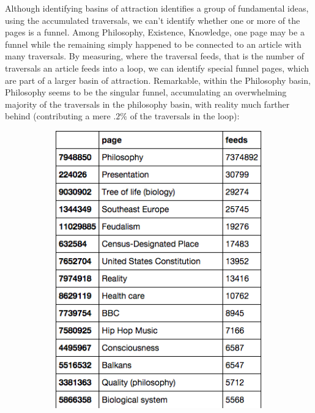 \documentclass[twoside]{article}
\begin{document}
Although identifying basins of attraction identifies a group of fundamental ideas, 
using the accumulated traversals, we can't identify whether one or more of the pages is a funnel. 
Among Philosophy, Existence, Knowledge, one page may be a funnel while the remaining simply happened to be connected to an article with many traversals. By measuring, where the traversal feeds, that is the number of traversals an article feeds into a loop, we can identify special funnel pages, 
which are part of a larger basin of attraction. Remarkable, within the Philosophy basin, 
Philosophy seems to be the singular funnel, accumulating an overwhelming majority of the traversals in the philosophy basin, with reality much farther behind (contributing a mere $.2\%$ of the 
traversals in the loop): 

\begin{figure}[H]
\centering
    \caption{Top Funnels}
    \begin{subfigure}[b]{0.5\textwidth}
        \includegraphics[width=\textwidth]{graphics/top_funnels.png}
    \end{subfigure}
\end{figure}
\end{document}
